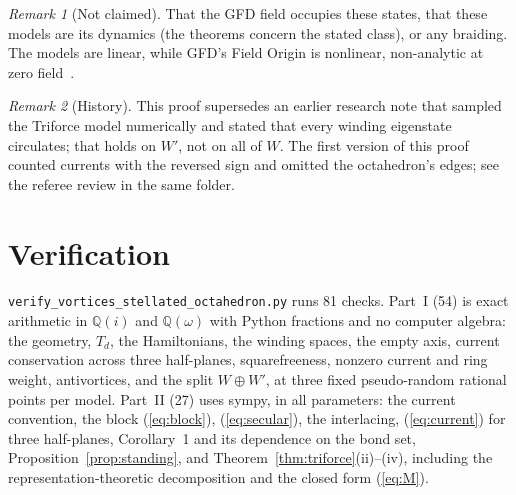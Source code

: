 \documentclass[twocolumn]{iopjournal}
\theoremstyle{definition}
\theoremstyle{remark}
\newtheorem*{remark}{Remark}
\begin{document}
\begin{remark}[Not claimed]
That the GFD field occupies these states, that these models are its
dynamics (the theorems concern the stated class), or any braiding. The
models are linear, while GFD's Field Origin is nonlinear, non-analytic
at zero field~\cite{NelsonColes}.
\end{remark}

\begin{remark}[History]
This proof supersedes an earlier research note that sampled the
Triforce model numerically and stated that every winding eigenstate
circulates; that holds on $W'$, not on all of $W$. The first version
of this proof counted currents with the reversed sign and omitted the
octahedron's edges; see the referee review in the same folder.
\end{remark}


\section*{Verification}

\texttt{verify\_vortices\_stellated\_octahedron.py} runs 81 checks.
Part~I (54) is exact arithmetic in $\mathbb Q(i)$ and $\mathbb Q(\omega)$
with Python fractions and no computer algebra: the geometry, $T_d$, the
Hamiltonians, the winding spaces, the empty axis, current conservation
across three half-planes, squarefreeness, nonzero current and ring
weight, antivortices, and the split $W\oplus W'$, at three fixed
pseudo-random rational points per model. Part~II (27) uses sympy, in
all parameters: the current convention, the block (\ref{eq:block}),
(\ref{eq:secular}), the interlacing, (\ref{eq:current}) for three
half-planes, Corollary~1 and its dependence on the bond set,
Proposition~\ref{prop:standing}, and Theorem~\ref{thm:triforce}(ii)--(iv),
including the representation-theoretic decomposition and the closed
form (\ref{eq:M}).
\end{document}
